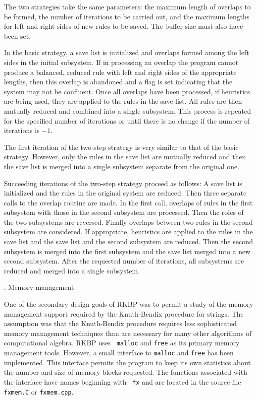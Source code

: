 The two strategies take the same parameters: the maximum length of
overlaps to be formed, the number of iterations to be carried out, and
the maximum lengths for left and right sides of new rules to be saved.
The buffer size must also have been set.

In the basic strategy, a save list is initialized and overlaps formed
among the left sides in the initial subsystem.  If in processing an
overlap the program cannot produce a balanced, reduced rule with left
and right sides of the appropriate lengths, then this overlap is
abandoned and a flag is set indicating that the system may not be
confluent.  Once all overlaps have been processed, if heuristics are
being used, they are applied to the rules in the save list.  All rules
are then mutually reduced and combined into a single subsystem.  This
process is repeated for the specified number of iterations or until
there is no change if the number of iterations is $-1$.

The first iteration of the two-step strategy is very similar to that
of the basic strategy.  However, only the rules in the save list are
mutually reduced and then the save list is merged into a single
subsystem separate from the original one.

Succeeding iterations of the two-step strategy proceed as follows: A
save list is initialized and the rules in the original system are
reduced.  Then three separate calls to the overlap routine are made.
In the first call, overlaps of rules in the first subsystem with those
in the second subsystem are processed.  Then the roles of the two
subsystems are reversed.  Finally overlaps between two rules in the
second subsystem are considered.  If appropriate, heuristics are
applied to the rules in the save list and the save list and the second
subsystem are reduced.  Then the second subsystem is merged into the
first subsystem and the save list merged into a new second subsystem.
After the requested number of iterations, all subsystems are reduced
and merged into a single subsystem.

\bigskip
{}.  Memory management

\nobreak

One of the secondary design goals of RKBP was to permit a study of the
memory management support required by the Knuth-Bendix procedure for
strings.  The assumption was that the Knuth-Bendix procedure requires
less sophisticated memory management techniques than are necessary for
many other algorithms of computational algebra.  RKBP uses {\tt
malloc} and {\tt free} as its primary memory management tools.
However, a small interface to {\tt malloc} and {\tt free} has been
implemented.  This interface permits the program to keep its own
statistics about the number and size of memory blocks requested.  The
functions associated with the interface have names beginning with {\tt
fx} and are located in the source file {\tt fxmem.C} or {\tt fxmem.cpp}.

